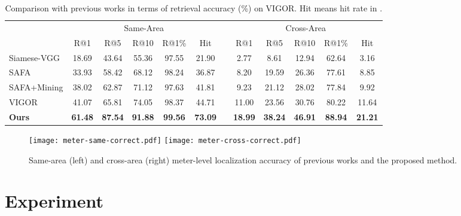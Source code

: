 \documentclass[10pt,twocolumn,letterpaper]{article}
\begin{document}
\begin{table*}[!htbp]
\centering
    \begin{tabular}{l c c c c c c c c c c c}
    \hline
    
    \hline & \multicolumn{5}{c}{Same-Area}& & \multicolumn{5}{c}{Cross-Area} \\
    \cline{2-6} \cline{8-12}
      ~ & R@1 & R@5 & R@10 & R@1\% & Hit &  & R@1 & R@5 & R@10 & R@1\% & Hit \\
     \hline
     \hline


     Siamese-VGG \cite{WACV} & 18.69 & 43.64 & 55.36 & 97.55 & 21.90  & & 2.77 & 8.61 & 12.94 & 62.64 & 3.16 \\
     SAFA \cite{SAFA} & 33.93 & 58.42 & 68.12 & 98.24 & 36.87 &  & 8.20 & 19.59 & 26.36  & 77.61  & 8.85 \\
     SAFA+Mining \cite{zhu2021vigor} & 38.02 & 62.87 & 71.12 & 97.63 & 41.81  & & 9.23 & 21.12 & 28.02 & 77.84 & 9.92  \\
     VIGOR \cite{zhu2021vigor} & 41.07 & 65.81 & 74.05 & 98.37 & 44.71 &  & 11.00 & 23.56  & 30.76 & 80.22 &  11.64 \\


     \textbf{Ours} & \textbf{61.48} & \textbf{87.54}  & \textbf{91.88}& \textbf{99.56} & \textbf{73.09} & & \textbf{18.99} & \textbf{38.24} & \textbf{46.91} & \textbf{88.94} & \textbf{21.21}\\
    \hline
    
    \hline
    \end{tabular}
    \caption{Comparison with previous works in terms of retrieval accuracy (\%) on VIGOR. Hit means hit rate in \cite{zhu2021vigor}.}
    \label{tab:vigor}
\end{table*}
\begin{figure*}[!htbp]
\centering
\vspace{-0.2cm}
\texttt{[image: meter-same-correct.pdf]}
\texttt{[image: meter-cross-correct.pdf]}
\vspace{-0.3cm}
\caption{Same-area (left) and cross-area (right) meter-level localization accuracy of previous works and the proposed method.}
\label{fig:meter}
\end{figure*}
\section{Experiment}
\end{document}
